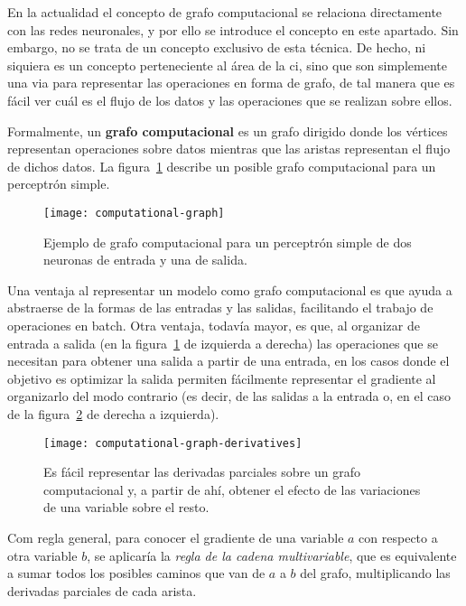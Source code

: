 En la actualidad el concepto de grafo computacional se relaciona directamente con las redes neuronales, y por ello se introduce el concepto en este apartado. Sin embargo, no se trata de un concepto exclusivo de esta técnica. De hecho, ni siquiera es un concepto perteneciente al área de la \ac{ci}, sino que son simplemente una via para representar las operaciones en forma de grafo, de tal manera que es fácil ver cuál es el flujo de los datos y las operaciones que se realizan sobre ellos.

Formalmente, un \textbf{grafo computacional} es un grafo dirigido donde los vértices representan operaciones sobre datos mientras que las aristas representan el flujo de dichos datos. La figura~\ref{fig:computational-graph} describe un posible grafo computacional para un perceptrón simple.

\begin{figure}
	\centering
	\texttt{[image: computational-graph]}
	\caption[Ejemplo de grafo computacional.]{Ejemplo de grafo computacional para un perceptrón simple de dos neuronas de entrada y una de salida.}
	\label{fig:computational-graph}
\end{figure}

Una ventaja al representar un modelo como grafo computacional es que ayuda a abstraerse de la formas de las entradas y las salidas, facilitando el trabajo de operaciones en batch. Otra ventaja, todavía mayor, es que, al organizar de entrada a salida (en la figura~\ref{fig:computational-graph} de izquierda a derecha) las operaciones que se necesitan para obtener una salida a partir de una entrada, en los casos donde el objetivo es optimizar la salida permiten fácilmente representar el gradiente al organizarlo del modo contrario (es decir, de las salidas a la entrada o, en el caso de la figura~\ref{fig:computational-graph-derivatives} de derecha a izquierda).

\begin{figure}
	\centering
	\texttt{[image: computational-graph-derivatives]}
	\caption[Derivadas parciales sobre un grafo computacional.]{Es fácil representar las derivadas parciales sobre un grafo computacional y, a partir de ahí, obtener el efecto de las variaciones de una variable sobre el resto.}
	\label{fig:computational-graph-derivatives}
\end{figure}

Com regla general, para conocer el gradiente de una variable $a$ con respecto a otra variable $b$, se aplicaría la \textit{regla de la cadena multivariable}, que es equivalente a sumar todos los posibles caminos que van de $a$ a $b$ del grafo, multiplicando las derivadas parciales de cada arista.


